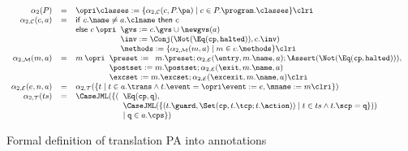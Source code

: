\begin{figure}[t]
\[{\small
\begin{array}{rcl}
\alpha_2(P) & = &\opri \classes :=
\{\alpha_{2, \mathcal{C}}(c, P.\pa) \mid c \in P.\program.\classes\} \clri\\

\alpha_{2,\mathcal{C}}(c, a) & = &
\mathsf{if\ }c.\name \not = a.\clname \mathsf{\ then\ }c\\
&&
\mathsf{else\ }c \:\opri
 \begin{array}[t]{l}
 \gvs := c.\gvs \cup \newgvs(a)\\
 \inv := \Conj(\Not(\Eq(\texttt{cp}, \texttt{halted})), c.\inv)\\
 \methods := \{\alpha_{2,\mathcal{M}}(m, a) \mid m \in c.\methods\} \clri
\end{array}\\
\alpha_{2,\mathcal{M}}(m, a) & = & m \: \opri
  \begin{array}[t]{l}
  \preset := \begin{array}[t]{l}
             m.\preset; \alpha_{2,\mathcal{E}}(\entry, m.\name, a);
             \Assert(\Not(\Eq(\texttt{cp}, \texttt{halted}))),
             \end{array}\\
  \postset := m.\postset; \alpha_{2, \mathcal{E}}(\exit, m.\name, a)\\
  \excset := m.\excset; \alpha_{2, \mathcal{E}}(\excexit, m.\name, a)
  \clri
  \end{array}\\
\alpha_{2, \mathcal{E}}(e, n, a) & = &
  \alpha_{2, \mathcal{T}}(\{t \mid t \in a.\trans \wedge
                                   t.\event = \opri \event := e,
                                                    \mname := m \clri
                           \})\\
\alpha_{2, \mathcal{T}}(ts) & = &
  \CaseJML(
    \{(\begin{array}[t]{l}
       \Eq(\texttt{cp}, \texttt{q}),\\
       \CaseJML(\{(t.\guard, \Set(\texttt{cp}, t.\tcp; t.\action)) \mid
                  t \in ts \wedge t.\scp = \texttt{q}
               \}))\\
    \mid \texttt{q} \in a.\cps
    \})
    \end{array}
\end{array}}
\]
\caption{Formal definition of translation PA into annotations}
\label{FigPAtoAnnot}
\end{figure}


